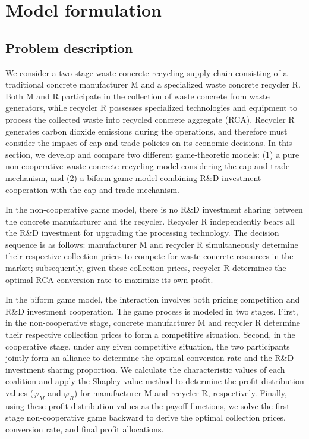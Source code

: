 \documentclass[authoryear,preprint,review,times,10pt]{elsarticle}
\begin{document}
\section{Model formulation}
\subsection{Problem description}
We consider a two-stage waste concrete recycling supply chain consisting of a traditional concrete manufacturer M and a specialized waste concrete recycler R. Both M and R participate in the collection of waste concrete from waste generators, while recycler R possesses specialized technologies and equipment to process the collected waste into recycled concrete aggregate (RCA). Recycler R generates carbon dioxide emissions during the operations, and therefore must consider the impact of cap-and-trade policies on its economic decisions. In this section, we develop and compare two different game-theoretic models: (1) a pure non-cooperative waste concrete recycling model considering the cap-and-trade mechanism, and (2) a biform game model combining R\&D investment cooperation with the cap-and-trade mechanism.

In the non-cooperative game model, there is no R\&D investment sharing between the concrete manufacturer and the recycler. Recycler R independently bears all the R\&D investment for upgrading the processing technology. The decision sequence is as follows: manufacturer M and recycler R simultaneously determine their respective collection prices to compete for waste concrete resources in the market; subsequently, given these collection prices, recycler R determines the optimal RCA conversion rate to maximize its own profit.

In the biform game model, the interaction involves both pricing competition and R\&D investment cooperation. The game process is modeled in two stages. First, in the non-cooperative stage, concrete manufacturer M and recycler R determine their respective collection prices to form a competitive situation. Second, in the cooperative stage, under any given competitive situation, the two participants jointly form an alliance to determine the optimal conversion rate and the R\&D investment sharing proportion. We calculate the characteristic values of each coalition and apply the Shapley value method to determine the profit distribution values ($\varphi_M$ and $\varphi_R$) for manufacturer M and recycler R, respectively. Finally, using these profit distribution values as the payoff functions, we solve the first-stage non-cooperative game backward to derive the optimal collection prices, conversion rate, and final profit allocations.
\end{document}
